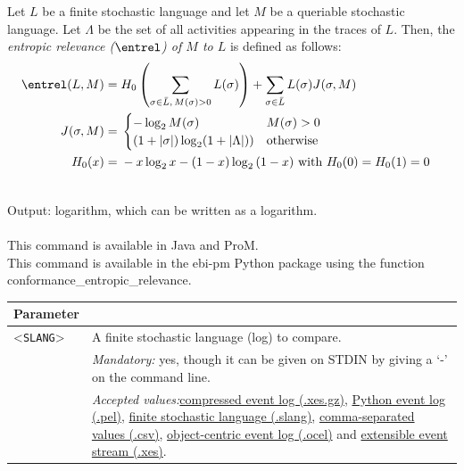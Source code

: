{        \begin{definition}
            \label{def:ER}
                Let $L$ be a finite stochastic language and let $M$ be a queriable stochastic language.
                Let $\Lambda$ be the set of all activities appearing in the traces of $L$.
                Then, the \emph{entropic relevance ($\entrel$) of $M$ to $L$} is defined as follows: 
                \begin{align*}
                    \entrel(L, M) ={}& H_0\left(\sum_{\sigma \in \bar{L},\, M(\sigma)>0}{L(\sigma)}\right) + 
                    \sum_{\sigma \in \bar{L}}L(\sigma) J(\sigma, M)\\
                    J(\sigma, M) ={}& \begin{cases}
                    -\log_2 M(\sigma) & M(\sigma) > 0\\
                    (1+|\sigma|) \log_2 (1 + |\Lambda|)) & \text{otherwise}
                    \end{cases}\\
                    H_0(x) ={}& -x \log_2{x} - (1-x) \log_2{(1-x)} \text{ with } H_0(0) = H_0(1) = 0 &\\
                \end{align*}       
            \end{definition}~\\
\noindent Output: logarithm, which can be written as a logarithm.\\
\\This command is available in Java and ProM.
\\This command is available in the ebi-pm Python package using the function conformance\_entropic\_relevance.
\begin{tabularx}{\linewidth}{lX}
\toprule
Parameter \\\midrule
<\texttt{SLANG}>&A finite stochastic language (log) to compare.\\
&\textit{Mandatory:} \quad yes, though it can be given on STDIN by giving a `-' on the command line.\\
&\textit{Accepted values:}\quad \hyperref[filehandler:compressed event log]{compressed event log (.xes.gz)}, \hyperref[filehandler:Python event log]{Python event log (.pel)}, \hyperref[filehandler:finite stochastic language]{finite stochastic language (.slang)}, \hyperref[filehandler:comma-separated values]{comma-separated values (.csv)}, \hyperref[filehandler:object-centric event log]{object-centric event log (.ocel)} and \hyperref[filehandler:extensible event stream]{extensible event stream (.xes)}.\\

\end{tabularx}}
